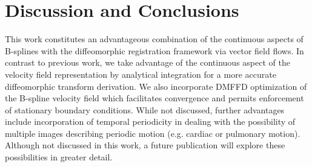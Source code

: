 \documentclass{llncs}
\begin{document}
\section{Discussion and Conclusions}
This work constitutes an advantageous combination of the continuous aspects of
B-splines with the diffeomorphic registration framework via vector field 
flows.  In contrast to previous work, we take advantage of the continuous 
aspect of the velocity field representation by analytical integration for
a more accurate diffeomorphic transform derivation.  We also incorporate
DMFFD optimization of the B-spline velocity field which facilitates 
convergence and permits enforcement of stationary boundary conditions.  
While not discussed, further advantages include incorporation of temporal 
periodicity in dealing with the possibility of multiple images describing
periodic motion (e.g. cardiac or pulmonary motion).  Although not discussed
in this work, a future publication will explore these possibilities in 
greater detail. 



\end{document}
